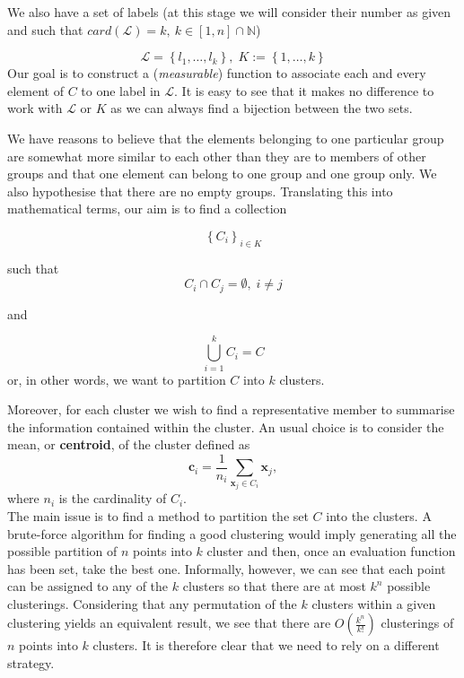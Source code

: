 \documentclass[a4paper]{article}
\begin{document}
	
	We also have a set of labels (at this stage we will consider their
	number as given and such that $card(\mathcal{L})=k,\:k\in\left[1,n\right]\cap\mathbb{N}$)
	
	$$
	\mathcal{L}=\left\{ l_{1},\ldots,l_{k}\right\} ,\;K:=\left\{ 1,\ldots,k\right\} 
	$$
	Our goal is to construct a (\textit{measurable}) function to associate each
	and every element of $C$ to one label in $\mathcal{L}$. It is easy
	to see that it makes no difference to work with $\mathcal{L}$ or
	$K$ as we can always find a bijection between the two sets.
	
	We have reasons to believe that the elements belonging to one particular
	group are somewhat more similar to each other than they are to members
	of other groups and that one element can belong to one group and one
	group only. We also hypothesise that there are no empty groups. Translating
	this into mathematical terms, our aim is to find a collection
	
	$$ 	\left\{ C_{i}\right\} _{i\in K}	$$
	
	such that
	$$ C_{i}\cap C_{j}=\emptyset,\;i\neq j $$
	
	and
	
	$$
	\bigcup_{i=1}^{k} C_{i} = C
	$$
	or, in other words, we want to partition $C$ into $k$ clusters.
	
	Moreover, for each cluster we wish to find a representative member to summarise the information contained within the cluster. An usual choice is to consider the mean, or \textbf{centroid}, of the cluster defined as
	\begin{equation*}
	\boldsymbol{c}_{i} = \frac{1}{n_{i}} \sum_{\boldsymbol{x}_{j} \in C_{i}} \boldsymbol{x}_{j},
	\end{equation*}
	where $n_{i}$ is the cardinality of $C_{i}$.\\
	
	The main issue is to find a method to partition the set $C$ into
	the clusters. A brute-force algorithm for finding a good clustering would imply generating all the possible partition of $n$ points into $k$ cluster and then, once an evaluation function has been set, take the best one. Informally, however, we can see that each point can be assigned to any of the $k$ clusters so that there are at most $k^{n}$ possible clusterings. Considering that any permutation of the $k$ clusters within a given clustering yields an equivalent result, we see that there are $O(\frac{k^{n}}{k!})$ clusterings of $n$ points into $k$ clusters. It is therefore clear that we need to rely on a different strategy.\\
	
\end{document}
